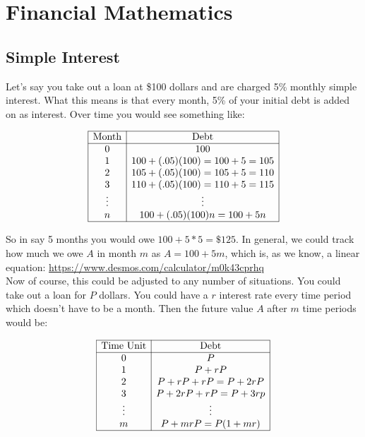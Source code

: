 
\chapter{Financial Mathematics}\label{Chapter:Financial}


\section{Simple Interest}\label{Section:SimpleInterest}

Let's say you take out a loan at \$100 dollars and are charged 5\% monthly simple interest.  What this means is that every month, 5\% of your initial debt is added on as interest.  Over time you would see something like:

$$\begin{array}{|c|c|}
\hline
\text{Month} & \text{Debt}\\
\hline
0 & 100\\
1& 100+(.05)(100)=100+5=105\\
2& 105+(.05)(100)=105+5=110\\
3 & 110+(.05)(100)=110+5=115\\
\vdots & \vdots\\
n & 100+(.05)(100)n=100+5n\\
\hline
\end{array}$$

So in say 5 months you would owe $100+5*5=\$125$.  In general, we could track how much we owe $A$ in month $m$ as $A=100+5m$, which is, as we know, a linear equation: \url{https://www.desmos.com/calculator/m0k43cprhq} \\

Now of course, this could be adjusted to any number of situations.  You could take out a loan for $P$ dollars.  You could have a $r$ interest rate every time period which doesn't have to be a month.  Then the future value $A$ after $m$ time periods would be:

$$\begin{array}{|c|c|}
\hline
\text{Time Unit} & \text{Debt}\\
\hline
0 & P\\
1& P+rP\\
2& P+rP+rP=P+2rP\\
3 & P+2rP+rP=P+3rp\\
\vdots & \vdots\\
m & P+mrP=P(1+mr)\\
\hline
\end{array}$$

